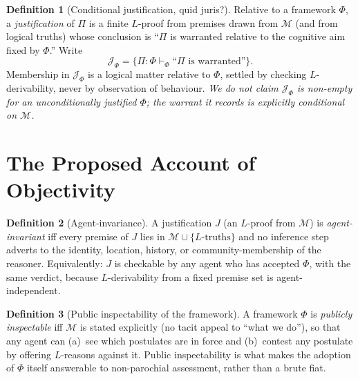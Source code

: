\documentclass{amsart}
\theoremstyle{definition}
\newtheorem{definition}{Definition}
\theoremstyle{plain}
\theoremstyle{remark}
\begin{document}
\begin{definition}[Conditional justification, quid juris?]\label{def:juris}
Relative to a framework $\Phi$, a \emph{justification} of $\Pi$ is a finite
$L$-proof from premises drawn from $\mathcal{M}$ (and from logical truths)
whose conclusion is ``$\Pi$ is warranted relative to the cognitive aim fixed by
$\Phi$.'' Write
\[
\mathcal{J}_\Phi=\{\Pi:\Phi\vdash_\Phi\text{``}\Pi\text{ is warranted''}\}.
\]
Membership in $\mathcal{J}_\Phi$ is a logical matter relative to $\Phi$,
settled by checking $L$-derivability, never by observation of behaviour.
\emph{We do not claim $\mathcal{J}_\Phi$ is non-empty for an unconditionally
justified $\Phi$; the warrant it records is explicitly conditional on
$\mathcal{M}$.}
\end{definition}

\section{The Proposed Account of Objectivity}

\begin{definition}[Agent-invariance]\label{def:invariance}
A justification $J$ (an $L$-proof from $\mathcal{M}$) is \emph{agent-invariant}
iff every premise of $J$ lies in $\mathcal{M}\cup\{L\text{-truths}\}$ and no
inference step adverts to the identity, location, history, or
community-membership of the reasoner. Equivalently: $J$ is checkable by any
agent who has accepted $\Phi$, with the same verdict, because $L$-derivability
from a fixed premise set is agent-independent.
\end{definition}

\begin{definition}[Public inspectability of the framework]\label{def:public}
A framework $\Phi$ is \emph{publicly inspectable} iff $\mathcal{M}$ is stated
explicitly (no tacit appeal to ``what we do''), so that any agent can (a)~see
which postulates are in force and (b)~contest any postulate by offering
$L$-reasons against it. Public inspectability is what makes the adoption of
$\Phi$ itself answerable to non-parochial assessment, rather than a brute fiat.
\end{definition}
\end{document}
